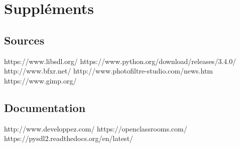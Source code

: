 \documentclass{article}
\begin{document}
\newpage

\section{Suppléments}

\subsection{Sources}

\noindent https://www.libsdl.org/ \newline
https://www.python.org/download/releases/3.4.0/ \newline
http://www.bfxr.net/ \newline
http://www.photofiltre-studio.com/news.htm \newline
https://www.gimp.org/


\subsection{Documentation}

\noindent http://www.developpez.com/ \newline
https://openclassrooms.com/ \newline
https://pysdl2.readthedocs.org/en/latest/
\end{document}
